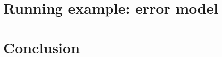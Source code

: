 \documentclass[conference]{IEEEtran}
\begin{document}
    \section{Running example: error model}



    \section{Conclusion}



%



    
    
\end{document}
